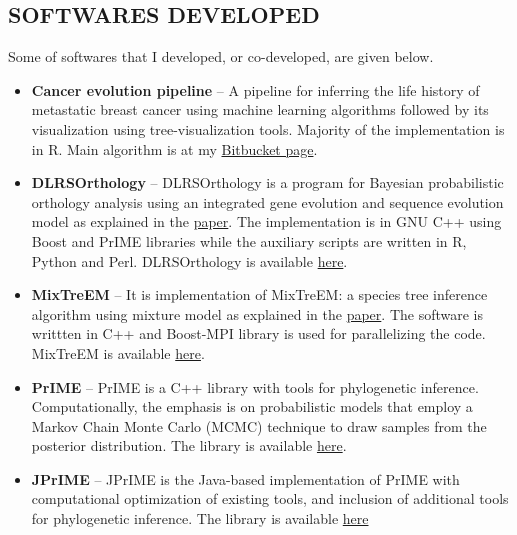 \documentclass[margin, 10pt]{res} %
\begin{document}
\begin{resume}


\section{SOFTWARES DEVELOPED} 
Some of softwares that I developed, or co-developed, are given below.
\begin{itemize}
\item \textbf{Cancer evolution pipeline} -- A pipeline for inferring the life history of metastatic breast cancer using machine learning algorithms followed by its visualization using tree-visualization tools. Majority of the implementation is in R. Main algorithm is at my \href{https://bitbucket.org/ikramu/dolloparsimonyforcancerevolution}{Bitbucket page}. 
\item \textbf{DLRSOrthology} -- DLRSOrthology is a program for Bayesian probabilistic orthology analysis using an integrated gene evolution and sequence evolution model as explained in the \href{https://doi.org/10.1093/sysbio/syv044}{paper}. The implementation is in GNU C++ using Boost and PrIME libraries while the auxiliary scripts are written in R, Python and Perl. DLRSOrthology is available \href{https://bitbucket.org/ikramu/dlrsorthology}{here}.
\item \textbf{MixTreEM} -- It is implementation of MixTreEM: a species tree inference algorithm using mixture model as explained in the \href{https://doi.org/10.1093/molbev/msv115}{paper}. The software is writtten in C++ and Boost-MPI library is used for parallelizing the code. MixTreEM is available \href{https://bitbucket.org/ikramu/mixtreem}{here}.
\item \textbf{PrIME} -- PrIME is a C++ library with tools for phylogenetic inference. Computationally, the emphasis is on probabilistic models that employ a Markov Chain Monte Carlo (MCMC) technique to draw samples from the posterior distribution. The library is available \href{http://prime.scilifelab.se/}{here}.
\item \textbf{JPrIME} -- JPrIME is the Java-based implementation of PrIME with computational optimization of existing tools, and inclusion of additional tools for phylogenetic inference. The library is available \href{https://github.com/arvestad/jprime}{here}
\end{itemize}



\end{resume}
\end{document}
